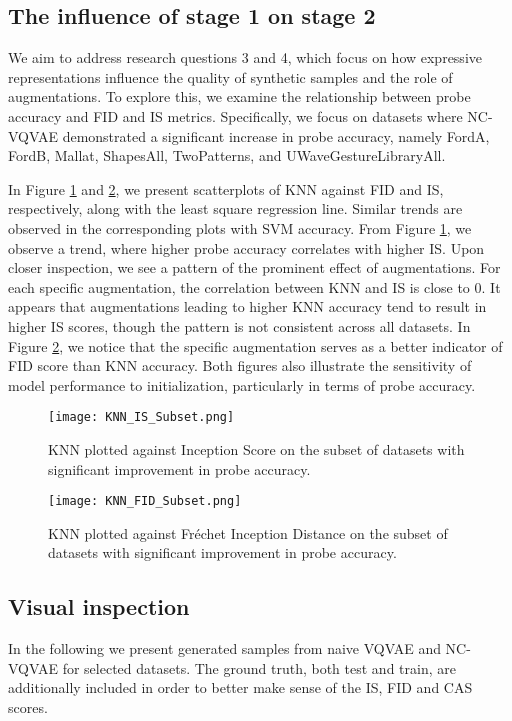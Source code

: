 \documentclass[../../thesis.tex]{subfiles}
\begin{document}
\subsection{The influence of stage 1 on stage 2}

We aim to address research questions 3 and 4, which focus on how expressive representations influence the quality of synthetic samples and the role of augmentations. To explore this, we examine the relationship between probe accuracy and FID and IS metrics. Specifically, we focus on datasets where NC-VQVAE demonstrated a significant increase in probe accuracy, namely FordA, FordB, Mallat, ShapesAll, TwoPatterns, and UWaveGestureLibraryAll.\newline

In Figure \ref{fig:KNN_IS_Subset} and \ref{fig:KNN_FID_Subset}, we present scatterplots of KNN against FID and IS, respectively, along with the least square regression line. Similar trends are observed in the corresponding plots with SVM accuracy. 
From Figure \ref{fig:KNN_IS_Subset}, we observe a trend, where higher probe accuracy correlates with higher IS. Upon closer inspection, we see a pattern of the prominent effect of augmentations. For each specific augmentation, the correlation between KNN and IS is close to $0$. It appears that augmentations leading to higher KNN accuracy tend to result in higher IS scores, though the pattern is not consistent across all datasets. In Figure \ref{fig:KNN_FID_Subset}, we notice that the specific augmentation serves as a better indicator of FID score than KNN accuracy. Both figures also illustrate the sensitivity of model performance to initialization, particularly in terms of probe accuracy.\newline
\begin{figure}[h]
    \texttt{[image: KNN\_IS\_Subset.png]}
    \centering  
    \caption{KNN plotted against Inception Score on the subset of datasets with significant improvement in probe accuracy.}
    \label{fig:KNN_IS_Subset}
\end{figure}

\begin{figure}[h]
    \texttt{[image: KNN\_FID\_Subset.png]}
    \centering  
    \caption{KNN plotted against Fréchet Inception Distance on the subset of datasets with significant improvement in probe accuracy.}
    \label{fig:KNN_FID_Subset}
\end{figure}



\subsection{Visual inspection}
\label{section:Visual inspection}
In the following we present generated samples from naive VQVAE and NC-VQVAE for selected datasets. The ground truth, both test and train, are additionally included in order to better make sense of the IS, FID and CAS scores. \newline
\end{document}
